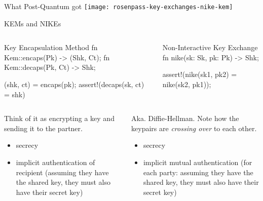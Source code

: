 \begin{frame}{What Post-Quantum got}
  \texttt{[image: rosenpass-key-exchanges-nike-kem]}
\end{frame}



\begin{frame}[fragile,T]{KEMs and NIKEs}
  \begin{columns}[fullwidth]
    \begin{column}{.48\linewidth}
\begin{rustblock}{Key Encapsulation Method}
fn Kem::encaps(Pk) -> (Shk, Ct);
fn Kem::decaps(Pk, Ct) -> Shk;

(shk, ct) = encaps(pk);
assert!(decaps(sk, ct) = shk)
\end{rustblock}
\end{column}\hfill
\begin{column}{.49\linewidth}
\begin{rustblock}{Non-Interactive Key Exchange}
fn nike(sk: Sk, pk: Pk) -> Shk;

assert!(nike(sk1, pk2) =
        nike(sk2, pk1));
\end{rustblock}
\end{column}
\end{columns}\hfill
\begin{columns}[t,fullwidth]
\begin{column}{.48\linewidth}
  Think of it as encrypting a key and sending it
        to the partner.

        \begin{itemize}
          \item secrecy
          \item implicit authentication of recipient
            (assuming they have the shared key, they must
            also have their secret key)
        \end{itemize}
\end{column}\hfill
\begin{column}{.48\linewidth}
        Aka. Diffie-Hellman. Note how the
        keypairs are \emph{crossing over} to each other.

        \begin{itemize}
          \item secrecy
          \item implicit mutual authentication
            (for each party: assuming they have the shared key, they must
            also have their secret key)
        \end{itemize}
    \end{column}
  \end{columns}
\end{frame}


